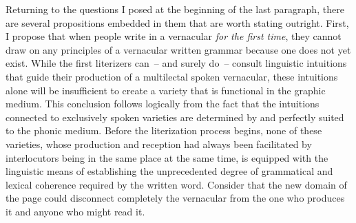 Returning to the questions I posed at the beginning of the last paragraph, there are several propositions embedded in them that are worth stating outright. First, I propose that when people write in a vernacular \textit{for the first time}, they cannot draw on any principles of a vernacular written grammar because one does not yet exist. While the first literizers can~-- and surely do~-- consult linguistic intuitions that guide their production of a multilectal spoken vernacular, these intuitions alone will be insufficient to create a variety that is functional in the graphic medium. This conclusion follows logically from the fact that the intuitions connected to exclusively spoken varieties are determined by and perfectly suited to the phonic medium. Before the literization process begins, none of these varieties, whose production and reception had always been facilitated by interlocutors being in the same place at the same time, is equipped with the linguistic means of establishing the unprecedented degree of grammatical and lexical coherence required by the written word. Consider that the new domain of the page could disconnect completely the vernacular from the one who produces it and anyone who might read it. 

